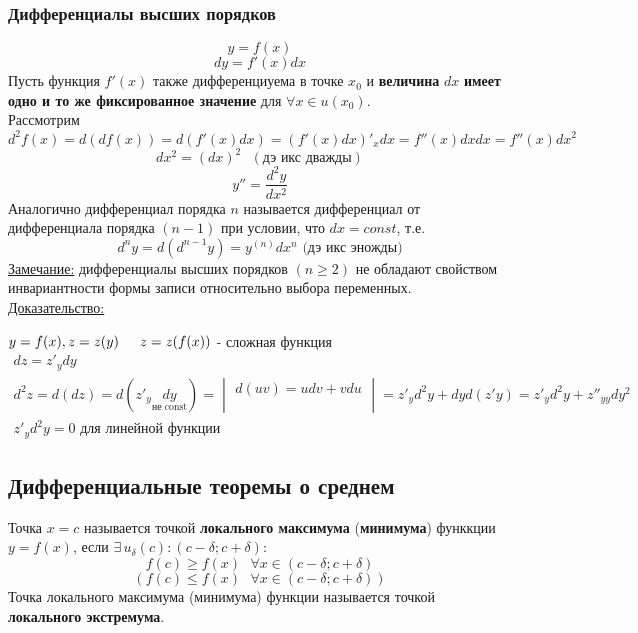 \documentclass[12pt]{article}
\begin{document}
    \subsubsection*{Дифференциалы высших порядков}
    \[ y = f(x) \]
    \[ dy = f'(x)dx \]
    Пусть функция $f'(x)$ также дифференциуема в точке $x_0$ и \textbf{величина} $dx$ \textbf{имеет одно и то же фиксированное значение} для $\forall x \in u(x_0)$.\\
    Рассмотрим \[ d^2f(x) = d(df(x)) = d(f'(x)dx) = (f'(x)dx)'_x dx = f''(x)dxdx = f''(x)dx^2 \] 
    \[ dx^2 = (dx)^2 \text{ } (\text{дэ икс дважды}) \]
    \[ y'' = \frac{d^2y}{dx^2} \]
    Аналогично дифференциал порядка $n$ называется дифференциал от дифференциала порядка $(n-1)$ при условии, что $dx = const$, т.е. 
    \[ d^ny = d(d^{n-1}y) = y^{(n)}dx^n \text{ (дэ икс эножды)} \]
    \underline{Замечание:} дифференциалы высших порядков $(n \ge 2)$ не обладают свойством инвариантности формы записи относительно выбора переменных.\\
    \underline{Доказательство:}
    \begin{adjustwidth}{1.5em}{1.5em}
        $y = f(x), z = z(y) \indent z = z(f(x))$ - сложная функция\\
        \begin{gather*}
            dz = z'_ydy\\
            d^2z = d(dz) = d(z'_y\underset{\text{не const}}{dy}) = \begin{vmatrix}
                d(uv) = udv + vdu\\
                \\
            \end{vmatrix} = z'_yd^2y + dyd(z'y) = z'_yd^2y + z''_{yy}dy^2\\
            z'_yd^2y = 0 \text{ для линейной функции}
        \end{gather*}
    \end{adjustwidth}

    \subsection{Дифференциальные теоремы о среднем}\noindent
    Точка $x = c$ называется точкой \textbf{локального максимума} (\textbf{минимума}) функкции $y = f(x)$, если $\exists\,u_\delta(c) : (c - \delta; c + \delta) : $\\
    \[ f(c) \ge f(x) \text{ } \forall x \in (c - \delta; c + \delta) \]
    \[ \left( f(c) \le f(x) \text{ } \forall x \in (c - \delta; c + \delta) \right) \]
    Точка локального максимума (минимума) функции называется точкой \textbf{локального экстремума}.
\end{document}

